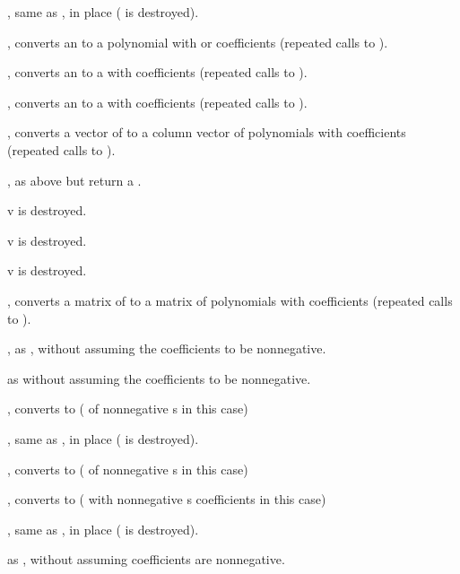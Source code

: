 , same as , in place
( is destroyed).

, converts an  to a polynomial with
 or  coefficients (repeated calls to ).

, converts an  to a  with
 coefficients (repeated calls to ).

, converts an  to a  with
 coefficients (repeated calls to ).

, converts a vector of  to a column
vector of polynomials with  coefficients (repeated calls to
).

, as above but return a .

 v is destroyed.

 v is destroyed.

 v is destroyed.

, converts a matrix of  to a matrix of
polynomials with  coefficients (repeated calls to ).

, as , without assuming
the coefficients to be nonnegative.

 as  without assuming
the coefficients to be nonnegative.

, converts to  ( of nonnegative
s in this case)

, same as , in place
( is destroyed).

, converts to  ( of nonnegative
s in this case)

, converts to  ( with
nonnegative s coefficients in this case)

, same as , in place
( is destroyed).

 as , without assuming
coefficients are nonnegative.

